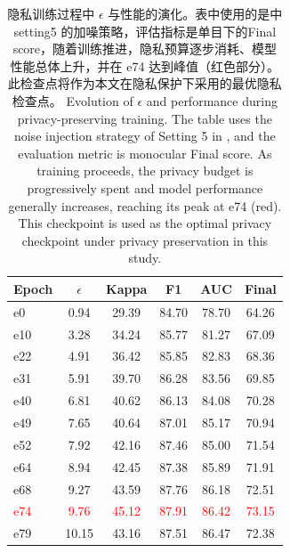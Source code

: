\begin{table}[!htb]
\centering
\caption{隐私训练过程中 $\epsilon$ 与性能的演化。表中使用的是中 setting5 的加噪策略，评估指标是单目下的Final score，随着训练推进，隐私预算逐步消耗、模型性能总体上升，并在 e74 达到峰值（红色部分）。此检查点将作为本文在隐私保护下采用的最优隐私检查点。 Evolution of $\epsilon$ and performance during privacy-preserving training. The table uses the noise injection strategy of Setting 5 in , and the evaluation metric is monocular Final score. As training proceeds, the privacy budget is progressively spent and model performance generally increases, reaching its peak at e74 (red). This checkpoint is used as the optimal privacy checkpoint under privacy preservation in this study.}
\label{tab:privacy-evolution}
\begin{tabular}{lccccc}
\toprule
Epoch & $\epsilon$ & Kappa & F1 & AUC & Final \\
\midrule
e0 & 0.94 & 29.39 & 84.70 & 78.70 & 64.26 \\
e10 & 3.28 & 34.24 & 85.77 & 81.27 & 67.09 \\
e22 & 4.91 & 36.42 & 85.85 & 82.83 & 68.36 \\
e31 & 5.91 & 39.70 & 86.28 & 83.56 & 69.85 \\
e40 & 6.81 & 40.62 & 86.13 & 84.08 & 70.28 \\
e49 & 7.65 & 40.64 & 87.01 & 85.17 & 70.94 \\
e52 & 7.92 & 42.16 & 87.46 & 85.00 & 71.54 \\
e64 & 8.94 & 42.45 & 87.38 & 85.89 & 71.91 \\
e68 & 9.27 & 43.59 & 87.76 & 86.18 & 72.51 \\
\textcolor{red}{e74} & \textcolor{red}{9.76} & \textcolor{red}{45.12} & \textcolor{red}{87.91} & \textcolor{red}{86.42} & \textcolor{red}{73.15} \\
e79 & 10.15 & 43.16 & 87.51 & 86.47 & 72.38 \\
\bottomrule
\end{tabular}
\end{table}
